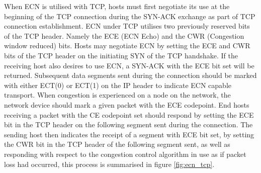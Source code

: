 \documentclass{l4proj}
\begin{document}
When ECN is utilised with TCP, hosts must first negotiate its use at the beginning of the TCP connection during the SYN-ACK exchange as part of TCP connection establishment. ECN under TCP utilises two previously reserved bits of the TCP header. Namely the ECE (ECN Echo) and the CWR (Congestion window reduced) bits. Hosts may negotiate ECN by setting the ECE and CWR bits of the TCP header on the initiating SYN of the TCP handshake. If the receiving host also desires to use ECN, a SYN-ACK with the ECE bit set will be returned. Subsequent data segments sent during the connection should be marked with either ECT(0) or ECT(1) on the IP header to indicate ECN capable transport. When congestion is experienced on a node on the network, the network device should mark a given packet with the ECE codepoint. End hosts receiving a packet with the CE codepoint set should respond by setting the ECE bit in the TCP header on the following segment sent during the connection. The sending host then indicates the receipt of a segment with ECE bit set, by setting the CWR bit in the TCP header of the following segment sent, as well as responding with respect to the congestion control algorithm in use as if packet loss had occurred, this process is summarised in figure \ref{fig:ecn_tcp}.
\end{document}
